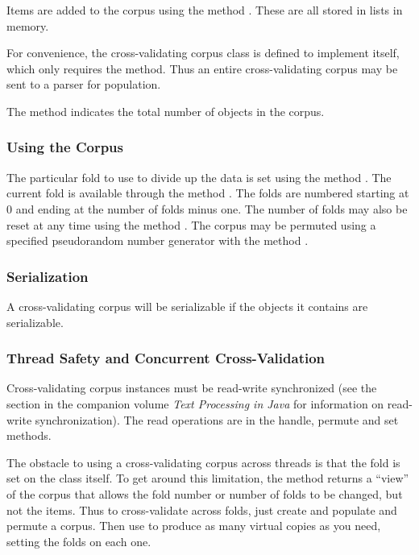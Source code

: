 Items are added to the corpus using the method .
These are all stored in lists in memory.  

For convenience, the cross-validating corpus class is defined to
implement  itself, which only requires the
 method.  Thus an entire cross-validating corpus may
be sent to a parser for population.

The  method indicates the total number of objects in the
corpus.

\subsubsection{Using the Corpus}

The particular fold to use to divide up the data is set using the
method .  The current fold is available through the
method .  The folds are numbered starting at 0 and ending
at the number of folds minus one.  The number of folds may also be
reset at any time using the method .  The corpus
may be permuted using a specified pseudorandom number generator with
the method .



\subsubsection{Serialization}

A cross-validating corpus will be serializable if the objects
it contains are serializable.  


\subsubsection{Thread Safety and Concurrent Cross-Validation}

Cross-validating corpus instances must be read-write synchronized (see
the section in the companion volume {\it Text Processing in Java} for
information on read-write synchronization).  The read operations are
in the handle, permute and set methods.

The obstacle to using a cross-validating corpus across threads is that
the fold is set on the class itself.  To get around this limitation,
the method  returns a ``view'' of the corpus that
allows the fold number or number of folds to be changed, but not the
items.  Thus to cross-validate across folds, just create and populate
and permute a corpus.  Then use  to produce as
many virtual copies as you need, setting the folds on each one.  

